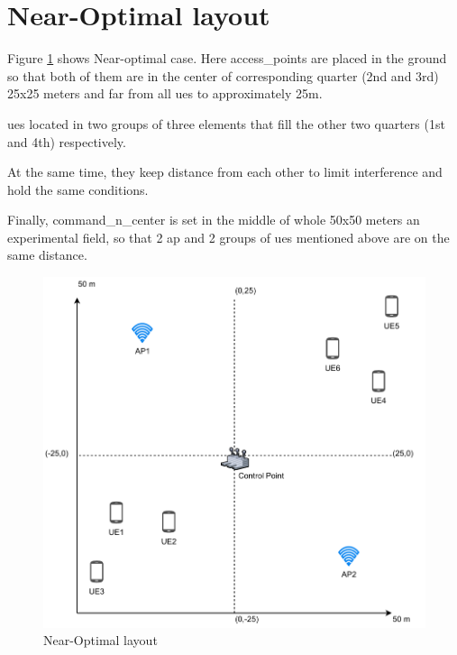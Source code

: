 \section{Near-Optimal layout}\label{near-optimal-layout}

Figure \ref{fig:near-optimal-layout} shows Near-optimal case. Here \glspl{access_point} are placed in the ground
so that both of them are in the center of corresponding quarter (2nd and 3rd) 25x25 meters and far from all \glspl{ue} to approximately 25m.

\glspl{ue} located in two groups of three elements that fill the other two
quarters (1st and 4th) respectively.

At the same time, they keep distance from each other to limit interference and hold the same conditions.

Finally, \gls{command_n_center} is set in the middle of whole 50x50 meters an
experimental field, so that 2 \gls{ap} and 2 groups of \glspl{ue} mentioned above are on the same distance.

\begin{figure}[H]
	\centering
	\includegraphics[width=\linewidth,keepaspectratio]{images/05-cases-description-Near-Optimal.pdf}
\caption{Near-Optimal layout}
\label{fig:near-optimal-layout}
\end{figure}
